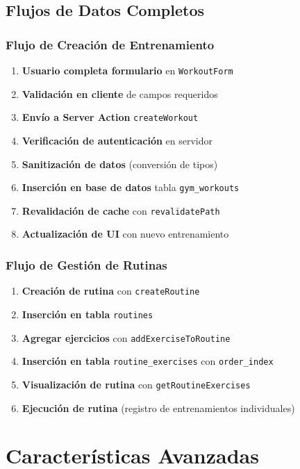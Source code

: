 \documentclass[12pt,a4paper]{article}
\begin{document}
\subsection{Flujos de Datos Completos}

\subsubsection{Flujo de Creación de Entrenamiento}

\begin{enumerate}
    \item \textbf{Usuario completa formulario} en \texttt{WorkoutForm}
    \item \textbf{Validación en cliente} de campos requeridos
    \item \textbf{Envío a Server Action} \texttt{createWorkout}
    \item \textbf{Verificación de autenticación} en servidor
    \item \textbf{Sanitización de datos} (conversión de tipos)
    \item \textbf{Inserción en base de datos} tabla \texttt{gym\_workouts}
    \item \textbf{Revalidación de cache} con \texttt{revalidatePath}
    \item \textbf{Actualización de UI} con nuevo entrenamiento
\end{enumerate}

\subsubsection{Flujo de Gestión de Rutinas}

\begin{enumerate}
    \item \textbf{Creación de rutina} con \texttt{createRoutine}
    \item \textbf{Inserción en tabla} \texttt{routines}
    \item \textbf{Agregar ejercicios} con \texttt{addExerciseToRoutine}
    \item \textbf{Inserción en tabla} \texttt{routine\_exercises} con \texttt{order\_index}
    \item \textbf{Visualización de rutina} con \texttt{getRoutineExercises}
    \item \textbf{Ejecución de rutina} (registro de entrenamientos individuales)
\end{enumerate}

\section{Características Avanzadas}
\end{document}
